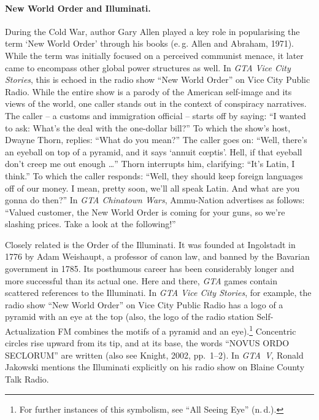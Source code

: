 \documentclass[]{scrartcl}
\begin{document}
\paragraph{New World Order and Illuminati.}
During the Cold War, author Gary Allen played a key role in popularising the term \enquote*{New World Order} through his books (e.\,g. Allen and Abraham, 1971).
While the term was initially focused on a perceived communist menace, it later came to encompass other global power structures as well.
In \textit{GTA Vice City Stories}, this is echoed in the radio show \enquote{New World Order} on Vice City Public Radio.
While the entire show is a parody of the American self-image and its views of the world, one caller stands out in the context of conspiracy narratives.
The caller -- a customs and immigration official -- starts off by saying:
\enquote{I wanted to ask:
What's the deal with the one-dollar bill?}
To which the show's host, Dwayne Thorn, replies:
\enquote{What do you mean?}
The caller goes on:
\enquote{Well, there's an eyeball on top of a pyramid, and it says \enquote{annuit cœptis}.
Hell, if that eyeball don't creep me out enough \dots}
Thorn interrupts him, clarifying:
\enquote{It's Latin, I think.}
To which the caller responds:
\enquote{Well, they should keep foreign languages off of our money.
I mean, pretty soon, we'll all speak Latin.
And what are you gonna do then?}
In \textit{GTA Chinatown Wars}, Ammu-Nation advertises as follows:
\enquote{Valued customer, the New World Order is coming for your guns, so we're slashing prices. Take a look at the following!}

Closely related is the Order of the Illuminati.
It was founded at Ingolstadt in 1776 by Adam Weishaupt, a professor of canon law, and banned by the Bavarian government in 1785.
Its posthumous career has been considerably longer and more successful than its actual one.
Here and there, \textit{GTA} games contain scattered references to the Illuminati.
In \textit{GTA Vice City Stories}, for example, the radio show \enquote{New World Order} on Vice City Public Radio has a logo of a pyramid with an eye at the top (also, the logo of the radio station Self-Actualization FM combines the motifs of a pyramid and an eye).\footnote{For further instances of this symbolism, see \enquote{All Seeing Eye} (n.\,d.).}
Concentric circles rise upward from its tip, and at its base, the words \enquote{\textsc{NOVUS ORDO SECLORUM}} are written (also see Knight, 2002, pp.~1--2).
In \textit{GTA~V}, Ronald Jakowski mentions the Illuminati explicitly on his radio show on Blaine County Talk Radio.
\end{document}
